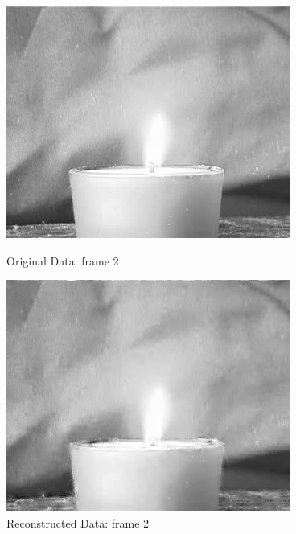 \documentclass[12pt]{article}
\begin{document}
\begin{itemize}
\begin{enumerate}
    \begin{figure}[H]
        \centering
        \begin{minipage}{.45\textwidth}
            \centering
            \includegraphics[width=\linewidth]{results/flame_5_orig_2.png}
            \caption*{Original Data: frame 2}
        \end{minipage}
        \begin{minipage}{.45\textwidth}
            \centering
            \includegraphics[width=\linewidth]{results/flame_5_recon_2.png}
            \caption*{Reconstructed Data: frame 2}
        \end{minipage}
    \end{figure}


\end{enumerate}
\end{itemize}
\end{document}
